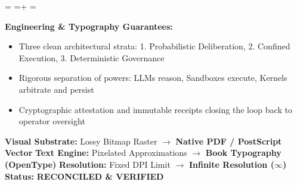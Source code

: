 \documentclass[10pt,a4paper,landscape]{article}
\newcommand{\pdautoscale}[2]{%
  \pdmaxh=#1\relax
  \pdmaxw=#2\relax
  \sbox{\pdscaledbox}{\usebox{\pdfigbox}}%
  \pdcurh=\dimexpr\ht\pdscaledbox+\dp\pdscaledbox\relax
  \pdcurw=\wd\pdscaledbox
  \ifdim\dimexpr\pdcurw * 100 / \pdmaxw\relax > \dimexpr\pdcurh * 100 / \pdmaxh\relax
    \resizebox{\pdmaxw}{!}{\usebox{\pdscaledbox}}%
  \else
    \resizebox{!}{\pdmaxh}{\usebox{\pdscaledbox}}%
  \fi
}
\begin{document}
\begin{minipage}[t]{0.492\linewidth}
  \begin{tcolorbox}[
    colback=pdcobalt!3,colframe=pdcobalt!85!black,arc=1.5pt,
    boxrule=0.7pt,top=1.5pt,bottom=1.5pt,left=4pt,right=4pt,
    title={\pdgrotesk\footnotesize\bfseries \color{white} B. Authoritative Native Vector Replacement \hfill \texttt{.tex / TikZ / PGF}}
  ]
    \begin{minipage}[c][8.3cm][c]{\linewidth}
      \centering
      \sbox{\pdfigbox}{}
      \pdautoscale{8.0cm}{\linewidth}
    \end{minipage}
    \tcblower
    \begin{minipage}[t][2.0cm][t]{\linewidth}
      \pdgrotesk\scriptsize
      \textbf{{\color{pdcobalt} Engineering \& Typography Guarantees:}}\\
      \begin{itemize}[leftmargin=9pt,itemsep=0pt,topsep=0.5pt,parsep=0pt]
        \item Three clean architectural strata: 1. Probabilistic Deliberation, 2. Confined Execution, 3. Deterministic Governance
        \item Rigorous separation of powers: LLMs reason, Sandboxes execute, Kernels arbitrate and persist
        \item Cryptographic attestation and immutable receipts closing the loop back to operator oversight
      \end{itemize}
    \end{minipage}
  \end{tcolorbox}
\end{minipage}

\vspace*{0.05cm}
\noindent
\begin{tcolorbox}[
  colback=hhpaper,colframe=hhgray!35,arc=1.5pt,boxrule=0.4pt,
  top=1.5pt,bottom=1.5pt,left=6pt,right=6pt
]
  \pdgrotesk\scriptsize
  \noindent
  \textbf{Visual Substrate:} Lossy Bitmap Raster $\rightarrow$ \textbf{\color{pdcobalt}Native PDF / PostScript Vector}\hfill
  \textbf{Text Engine:} Pixelated Approximations $\rightarrow$ \textbf{\color{pdcobalt}Book Typography (OpenType)}\hfill
  \textbf{Resolution:} Fixed DPI Limit $\rightarrow$ \textbf{\color{pdcobalt}Infinite Resolution ($\infty$)}\hfill
  \textbf{Status:} \textbf{\color{pdteal}RECONCILED \& VERIFIED}
\end{tcolorbox}
\clearpage
\end{document}
